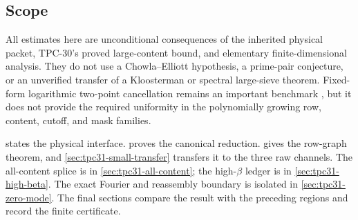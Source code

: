 \subsection{Scope}

All estimates here are unconditional consequences of the inherited
physical packet, TPC-30's proved large-content bound, and elementary
finite-dimensional analysis.  They do not use a Chowla--Elliott
hypothesis, a prime-pair conjecture, or an unverified transfer of a
Kloosterman or spectral large-sieve theorem.  Fixed-form logarithmic
two-point cancellation remains an important benchmark
\citep{Tao2016}, but it does not provide the required uniformity in
the polynomially growing row, content, cutoff, and mask families.

 states the physical interface.
 proves the canonical reduction.
 gives the row-graph theorem, and
\cref{sec:tpc31-small-transfer} transfers it to the three raw
channels.  The all-content splice is in
\cref{sec:tpc31-all-content}; the high-$\beta$ ledger is in
\cref{sec:tpc31-high-beta}.  The exact Fourier and reassembly boundary
is isolated in \cref{sec:tpc31-zero-mode}.  The final sections compare
the result with the preceding regions and record the finite
certificate.
